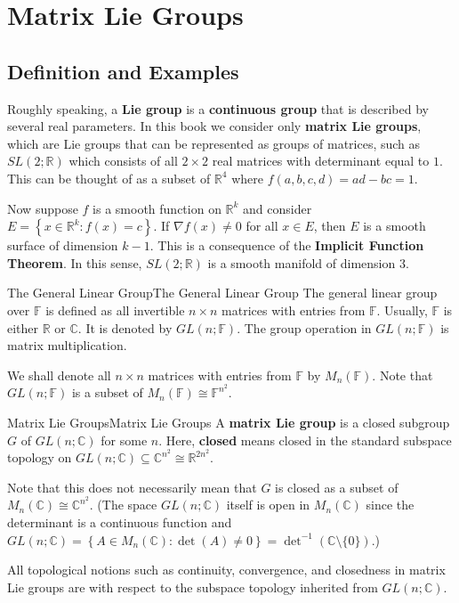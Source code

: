 \documentclass[../main.tex]{subfiles}
\begin{document}
\chapter{Matrix Lie Groups}

\section{Definition and Examples}
Roughly speaking, a \textbf{Lie group} is a \textbf{continuous group} that is described by several real parameters. In this book we consider only \textbf{matrix Lie groups}, which are Lie groups that can be represented as groups of matrices, such as $SL(2;\mathbb{R})$ which consists of all $2 \times 2$ real matrices with determinant equal to $1$. This can be thought of as a subset of $\mathbb{R}^4$ where $f(a,b,c,d) = ad-bc=1$.

Now suppose $f$ is a smooth function on $\mathbb{R}^k$ and consider $E = \left\{ x\in \mathbb{R}^k: f(x) = c \right\}$. If $\nabla f(x) \neq 0$ for all $x \in E$, then $E$ is a smooth surface of dimension $k-1$. This is a consequence of the \textbf{Implicit Function Theorem}. In this sense, $SL(2;\mathbb{R})$ is a smooth manifold of dimension $3$.

\begin{definition}{The General Linear Group}{The General Linear Group}
	The general linear group over $\mathbb{F}$ is defined as all invertible $n \times n$ matrices with entries from $\mathbb{F}$. Usually, $\mathbb{F}$ is either $\mathbb{R}$ or $\mathbb{C}$. It is denoted by $GL(n;\mathbb{F})$. The group operation in $GL(n;\mathbb{F})$ is matrix multiplication.
\end{definition}

We shall denote all $n \times n$ matrices with entries from $\mathbb{F}$ by $M_{n}(\mathbb{F})$. Note that $GL(n;\mathbb{F})$ is a subset of $M_{n}(\mathbb{F}) \cong \mathbb{F}^{n^2}$.

\begin{definition}{Matrix Lie Groups}{Matrix Lie Groups}
	A \textbf{matrix Lie group} is a closed subgroup $G$ of $GL(n;\mathbb{C})$ for some $n$. Here, \textbf{closed} means closed in the standard subspace topology on $GL(n;\mathbb{C}) \subseteq \mathbb{C}^{n^2} \cong \mathbb{R}^{2n^2}$.
\end{definition}
\begin{remark}
	Note that this does not necessarily mean that $G$ is closed as a subset of $M_{n}(\mathbb{C})\cong \mathbb{C}^{n^2}$. (The space $GL(n;\mathbb{C})$ itself is open in $M_{n}(\mathbb{C})$ since the determinant is a continuous function and $GL(n;\mathbb{C}) = \left\{ A \in M_{n}(\mathbb{C}): \det(A) \neq 0 \right\} = \det^{-1}(\mathbb{C} \setminus \{0\})$.)

	All topological notions such as continuity, convergence, and closedness in matrix Lie groups are with respect to the subspace topology inherited from $GL(n;\mathbb{C})$.
\end{remark}
\end{document}
